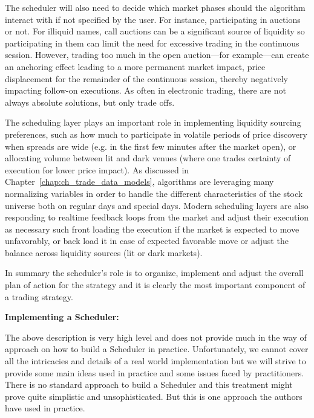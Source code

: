 The scheduler will also need to decide which market phases should the algorithm interact with if not specified by the user. For instance, participating in auctions or not. For illiquid names, call auctions can be a significant source of liquidity so participating in them can limit the need for excessive trading in the continuous session. However, trading too much in the open auction---for example---can create an anchoring effect leading to a more permanent market impact, price displacement for the remainder of the continuous session, thereby negatively impacting follow-on executions. As often in electronic trading, there are not always absolute solutions, but only trade offs.


The scheduling layer plays an important role in  implementing liquidity sourcing preferences, such as how much to participate in volatile periods of price discovery when spreads are wide (e.g. in the first few minutes after the market open), or allocating volume between lit and dark venues (where one trades certainty of execution for lower price impact). As discussed in Chapter~\ref{chap:ch_trade_data_models}, algorithms are leveraging many normalizing  variables in order to handle the different characteristics of the stock universe both on regular days and special days.  Modern scheduling layers are also responding to realtime feedback loops from the market and adjust their execution as necessary such front loading the execution if the market is expected to move unfavorably, or back load it in case of expected favorable move or adjust the balance across liquidity sources (lit or dark markets). 


In summary the scheduler's role is to organize, implement and adjust the overall plan of action for the strategy and it is clearly the most important component of a trading strategy. \twomedskip


\noindent\textbf{Implementing a Scheduler:} \twomedskip


The above description is very high level and does not provide much in the way of approach on how to build a Scheduler in practice. Unfortunately, we cannot cover all the intricacies and details of a real world implementation but we will strive to provide some main ideas used in practice and some issues faced by practitioners. There is no standard approach to build a Scheduler and this treatment might prove quite simplistic and unsophisticated. But this is one approach the authors have used in practice. \twomedskip


